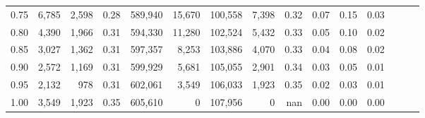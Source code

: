 \begin{tabular}{rrrrrrrrrrrrrrr}
0.75 &   6,785 &   2,598 &  0.28 &  589,940 &   15,670 &  100,558 &    7,398 &  0.32 &  0.07 &  0.15 &      0.03 \\
0.80 &   4,390 &   1,966 &  0.31 &  594,330 &   11,280 &  102,524 &    5,432 &  0.33 &  0.05 &  0.10 &      0.02 \\
0.85 &   3,027 &   1,362 &  0.31 &  597,357 &    8,253 &  103,886 &    4,070 &  0.33 &  0.04 &  0.08 &      0.02 \\
0.90 &   2,572 &   1,169 &  0.31 &  599,929 &    5,681 &  105,055 &    2,901 &  0.34 &  0.03 &  0.05 &      0.01 \\
0.95 &   2,132 &     978 &  0.31 &  602,061 &    3,549 &  106,033 &    1,923 &  0.35 &  0.02 &  0.03 &      0.01 \\
1.00 &   3,549 &   1,923 &  0.35 &  605,610 &        0 &  107,956 &        0 &   nan &  0.00 &  0.00 &      0.00 \\
\bottomrule
\end{tabular}
